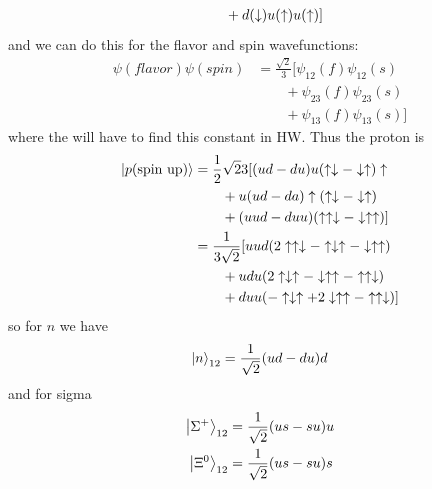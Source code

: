 \documentclass[../main.tex]{subfiles}
\begin{document}
\begin{itemize}
\begin{align*}
        &\qquad + d(\downarrow) u(\uparrow) u(\uparrow)] \\
    \end{align*}
    and we can do this for the flavor and spin wavefunctions:
    \begin{align*}
        \psi(flavor) \psi(spin) &= \frac{\sqrt{2}}{3} [\psi_{12}(f)\psi_{12}(s) \\
        &\qquad + \psi_{23}(f)\psi_{23}(s) \\
        &\qquad + \psi_{13}(f)\psi_{13}(s)]
    \end{align*}
where the will have to find this constant in HW. Thus the proton is
\begin{align*}
    \ket{p(\text{spin up})} &= \frac{1}{2 }\sqrt{2}{3} [(ud -du)u (\uparrow\downarrow - \downarrow\uparrow)\uparrow \\
    &\qquad + u(ud - da) \uparrow(\uparrow\downarrow - \downarrow\uparrow) \\
    &\qquad + (uud - duu) (\uparrow\uparrow\downarrow - \downarrow\uparrow\uparrow)] \\
    &= \frac{1}{3\sqrt{2}} [uud(2\uparrow\uparrow\downarrow - \uparrow\downarrow\uparrow - \downarrow\uparrow\uparrow) \\
    &\qquad + udu(2\uparrow\downarrow\uparrow - \downarrow\uparrow\uparrow - \uparrow\uparrow\downarrow) \\
    &\qquad + duu(-\uparrow\downarrow\uparrow + 2\downarrow\uparrow\uparrow - \uparrow\uparrow\downarrow)]
\end{align*}
so for $n$ we have
\begin{align*}
    \ket{n}_{12} = \frac{1}{\sqrt{2}} (ud -du)d 
\end{align*}
and for sigma
\begin{align*}
    \ket{\Sigma^+}_{12} &= \frac{1}{\sqrt{2}} (us -su)u \\
    \ket{\Xi^0}_{12} &= \frac{1}{\sqrt{2}} (us -su)s
\end{align*}
\end{itemize}
\end{document}
